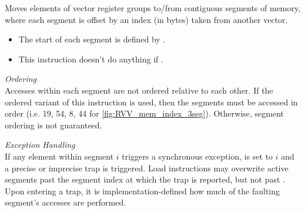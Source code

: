 
Moves elements of  vector register groups to/from contiguous segments of memory,
where each segment is offset by an index (in bytes) taken from another vector.

\begin{itemize}
\item The start of each segment is defined by .
\item This instruction doesn't do anything if .
\end{itemize}

\noindent
\emph{Ordering}
\\\noindent
Accesses within each segment are not ordered relative to each other.
If the ordered variant of this instruction is used, then the segments must be accessed in order (i.e. 19, 54, 8, 44 for \cref{fig:RVV_mem_index_3seg}).
Otherwise, segment ordering is not guaranteed.


\noindent
\emph{Exception Handling}
\\\noindent
If any element within segment $i$ triggers a synchronous exception,  is set to $i$ and a precise or imprecise trap is triggered.
Load instructions may overwrite active segments past the segment index at which the trap is reported, but not past \cite[Section 7.7]{RISCVVectorExtension2021}.
Upon entering a trap, it is implementation-defined how much of the faulting segment's accesses are performed.


